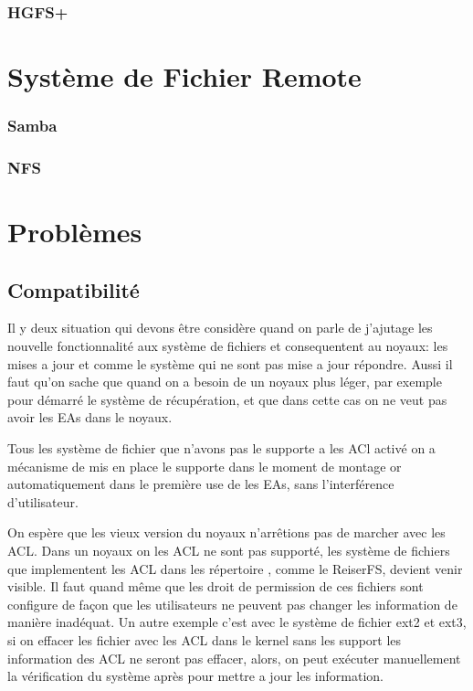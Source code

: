 \subsubsection*{HGFS+}

\section*{Système de Fichier Remote}
\subsubsection*{Samba}

\subsubsection*{NFS}
\section*{Problèmes}

\subsection*{Compatibilité}

Il y deux situation qui devons être considère quand on parle de j'ajutage les nouvelle fonctionnalité aux système de fichiers et consequentent au noyaux: les mises a jour et comme le système qui ne sont pas mise a jour répondre.
Aussi il faut qu'on sache que quand on a besoin de un noyaux plus léger, par exemple pour démarré le système de récupération, et que dans cette cas on ne veut pas avoir les EAs dans le noyaux. 

Tous les système de fichier que n'avons pas le supporte a les ACl activé on a mécanisme de mis en place le supporte dans le moment de montage or automatiquement dans le première use de les EAs, sans l'interférence d'utilisateur. 

On espère que les vieux version du noyaux n'arrêtions pas de marcher avec les ACL. Dans un noyaux on les ACL ne sont pas supporté, les système de fichiers que implementent les ACL dans les répertoire , comme le ReiserFS, devient venir visible. Il faut quand même que les droit de permission de ces fichiers sont configure de façon que les utilisateurs ne peuvent pas changer les information de manière inadéquat. Un autre exemple c'est avec le système de fichier ext2 et ext3, si on effacer les fichier avec les ACL dans le kernel sans les support les information des ACL ne seront pas effacer, alors, on peut exécuter manuellement la vérification du système après pour mettre a jour les information. 
 	
